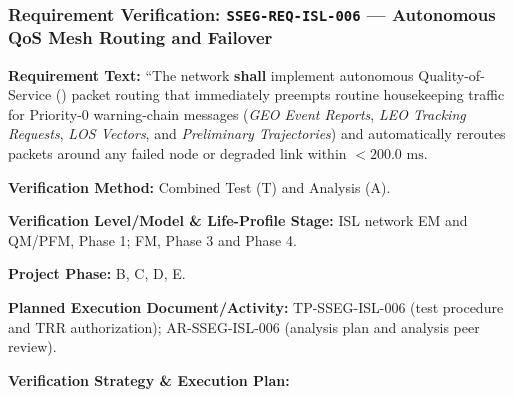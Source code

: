 \subsubsection{Requirement Verification: \texttt{SSEG-REQ-ISL-006} --- Autonomous QoS Mesh Routing and Failover}
\label{ver:SSEG-REQ-ISL-006}
\textbf{Requirement Text:} ``The   network \textbf{shall} implement autonomous Quality-of-Service () packet routing that immediately preempts routine housekeeping traffic for Priority-0 warning-chain messages (\emph{GEO Event Reports}, \emph{LEO Tracking Requests}, \emph{LOS Vectors}, and \emph{Preliminary Trajectories}) and automatically reroutes packets around any failed node or degraded link within $< 200.0\text{ ms}$.
\par\textbf{Verification Method:} Combined Test (T) and Analysis (A).
\par\textbf{Verification Level/Model \& Life-Profile Stage:} ISL network EM and QM/PFM, Phase 1; FM, Phase 3 and Phase 4.
\par\textbf{Project Phase:} B, C, D, E.
\par\textbf{Planned Execution Document/Activity:} TP-SSEG-ISL-006 (test procedure and TRR authorization); AR-SSEG-ISL-006 (analysis plan and analysis peer review).
\par\textbf{Verification Strategy \& Execution Plan:}
